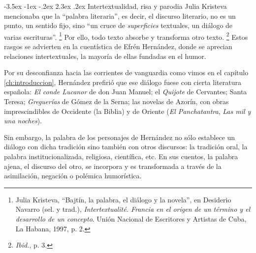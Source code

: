 \documentclass[14pt,twoside,final]{extbook} %
\makeatletter
\let\oldfootnote\footnote
\renewcommand\footnote[1]{%
\oldfootnote{\hspace{1mm}#1}}
\renewcommand\section{\@startsection {section}{1}{\z@}%
                                     {-3.5ex \@plus -1ex \@minus -.2ex}%
                                     {2.3ex \@plus .2ex}%
                                     {\normalfont\large\bfseries\sc}}
\makeatother
\begin{document}
\section{Intertextualidad, risa y parodia}\label{sec:intertextualidad-risa-parodia}
Julia Kristeva mencionaba que la ``palabra literaria'', es decir, el discurso literario, no es un punto, un sentido fijo, sino ``un cruce de \emph{superficies} textuales, un diálogo de varias escrituras''.\footnote{Julia Kristeva, ``Bajtín, la palabra, el diálogo y la novela'', en Desiderio Navarro (sel. y trad.), \emph{Intertextualité. Francia en el origen de un término y el desarrollo de un concepto}. Unión Nacional de Escritores y Artistas de Cuba, La Habana, 1997, p. 2.} Por ello, todo texto absorbe y transforma otro texto.\footnote{\emph{Ibid.}, p. 3.} Estos rasgos se advierten en la cuentística de Efrén Hernández, donde se aprecian relaciones intertextuales, la mayoría de ellas fundadas en el humor.

Por su desconfianza hacia las corrientes de vanguardia como vimos en el capítulo \ref{ch:introduccion}, Hernández prefirió que ese diálogo fuese con cierta literatura española: \emph{El conde Lucanor} de don Juan Manuel; el \emph{Quijote} de Cervantes; Santa Teresa; \emph{Greguerías} de Gómez de la Serna; las novelas de Azorín, con obras imprescindibles de Occidente (la Biblia) y de Oriente (\emph{El Panchatantra}, \emph{Las mil y una noches}).\protect\enlargethispage*{\baselineskip}

Sin embargo, la palabra de los personajes de Hernández no sólo establece un diálogo con dicha tradición sino también con otros discursos: la tradición oral, la palabra institucionalizada, religiosa, científica, etc. En sus cuentos, la palabra ajena, el discurso del otro, se incorpora y es transformada a través de la asimilación, negación o polémica humorística.
\end{document}
